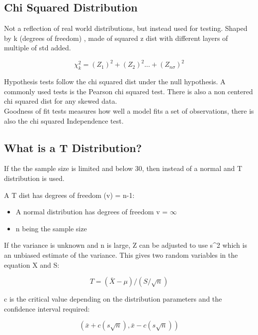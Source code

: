 \documentclass[11pt]{scrartcl} %
\begin{document}
\subsection{Chi Squared Distribution}

Not a reflection of real world distributions, but instead used for testing. Shaped by k (degrees of freedom)
, made of squared z dist with different layers of multiple of std added.

\begin{equation}
	\chi^2_{k} = (Z_1)^2 + (Z_2)^2 ... + (Z_{n\sigma})^2
\end{equation}

Hypothesis tests follow the chi squared dist under the null hypothesis. A commonly used tests is the
Pearson chi squared test. There is also a non centered chi squared dist for any skewed data.\\

Goodness of fit tests measures how well a model fits a set of observations, there is also the chi
squared Independence test.

\subsection{What is a T
Distribution?}

If the the sample size is limited and below 30, then instead of a normal
and T distribution is used.

A T dist has degrees of freedom (v) = n-1:

\begin{itemize}
\item A normal distribution has degrees of freedom v = \(\infty\)
\item n being the sample size
\end{itemize}

If the variance is unknown and n is large, Z can be adjusted to use
s\^{}2 which is an unbiased estimate of the variance. This gives two
random variables in the equation X and S:

\begin{equation}
	T = (\bar{X} - \mu)/ (S/\sqrt{n})
\end{equation}

c is the critical value depending on the distribution parameters and the
confidence interval required:

\begin{equation}
	(\bar{x} + c(s\sqrt{n}),\bar{x} - c(s\sqrt{n}))
\end{equation}
\end{document}
